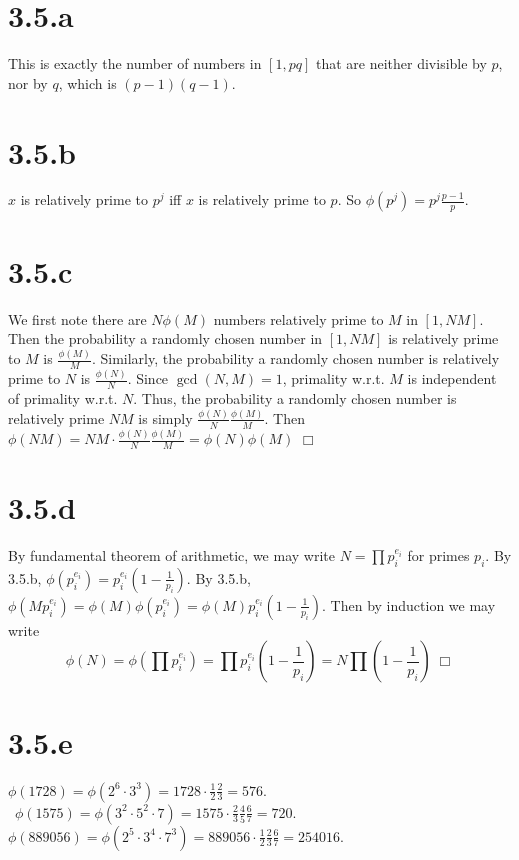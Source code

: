 \documentclass{article}
\begin{document}
\section*{3.5.a}
This is exactly the number of numbers in $[1,pq]$ that are neither divisible by $p$, nor by $q$, which is $(p-1)(q-1)$.

\section*{3.5.b}
$x$ is relatively prime to $p^j$ iff $x$ is relatively prime to $p$. So $\phi(p^j) = p^j\frac{p-1}{p}$.

\section*{3.5.c}
We first note there are $N\phi(M)$ numbers relatively prime to $M$ in $[1,NM]$. Then the probability a randomly chosen number in $[1,NM]$ is relatively prime to $M$ is $\frac{\phi(M)}{M}$. Similarly, the probability a randomly chosen number is relatively prime to $N$ is $\frac{\phi(N)}{N}$. Since $\gcd(N,M) = 1$, primality w.r.t. $M$ is independent of primality w.r.t. $N$. Thus, the probability a randomly chosen number is relatively prime $NM$ is simply $\frac{\phi(N)}{N}\frac{\phi(M)}{M}$. Then $\phi(NM) = NM \cdot \frac{\phi(N)}{N}\frac{\phi(M)}{M} = \phi(N)\phi(M)$ $\Box$

\section*{3.5.d}
By fundamental theorem of arithmetic, we may write $N = \prod p_i^{e_i}$ for primes $p_i$. By 3.5.b, $\phi(p_i^{e_i}) = p_i^{e_i}\left(1-\frac{1}{p_i}\right)$. By 3.5.b, $\phi(M p_i^{e_i}) = \phi(M)\phi(p_i^{e_i}) = \phi(M)p_i^{e_i}\left(1-\frac{1}{p_i}\right)$. Then by induction we may write
$$\phi(N) = \phi(\prod p_i^{e_i}) = \prod p_i^{e_i}\left(1-\frac{1}{p_i}\right) = N \prod \left(1-\frac{1}{p_i}\right) \; \Box$$

\section*{3.5.e}
$\phi(1728) = \phi(2^6 \cdot 3^3) = 1728 \cdot \frac{1}{2}\frac{2}{3} = 576$.\\\
$\phi(1575) = \phi(3^2 \cdot 5^2 \cdot 7) = 1575 \cdot \frac{2}{3}\frac{4}{5}\frac{6}{7} = 720$.\\
$\phi(889056) = \phi(2^5 \cdot 3^4 \cdot 7^3) = 889056 \cdot \frac{1}{2}\frac{2}{3}\frac{6}{7} = 254016$.
\end{document}
